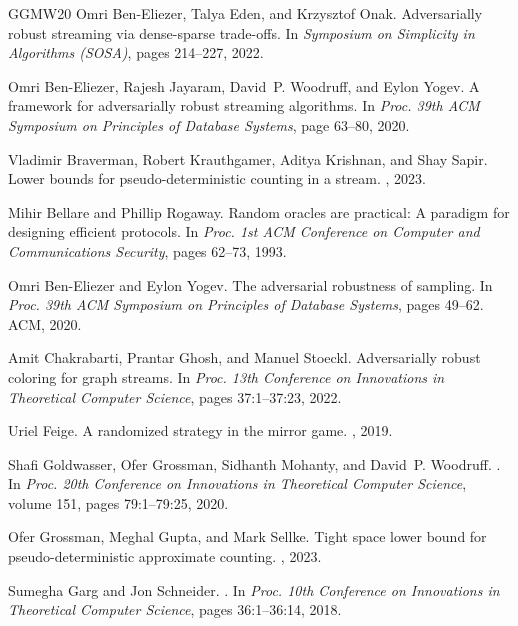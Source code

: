 \documentclass[10pt,a4paper]{article}
\theoremstyle{definition}
\theoremstyle{remark}
\begin{document}
\begin{itemize}
\begin{itemize}
\begin{thebibliography}{GGMW20}
Omri Ben-Eliezer, Talya Eden, and Krzysztof Onak.
\newblock Adversarially robust streaming via dense-sparse trade-offs.
\newblock In {\em Symposium on Simplicity in Algorithms (SOSA)}, pages
  214--227, 2022.

Omri Ben{-}Eliezer, Rajesh Jayaram, David~P. Woodruff, and Eylon Yogev.
\newblock A framework for adversarially robust streaming algorithms.
\newblock In {\em Proc. 39th ACM Symposium on Principles of Database Systems},
  page 63–80, 2020.

Vladimir Braverman, Robert Krauthgamer, Aditya Krishnan, and Shay Sapir.
\newblock Lower bounds for pseudo-deterministic counting in a stream.
, 2023.

Mihir Bellare and Phillip Rogaway.
\newblock Random oracles are practical: A paradigm for designing efficient
  protocols.
\newblock In {\em Proc. 1st ACM Conference on Computer and Communications
  Security}, pages 62--73, 1993.

Omri Ben{-}Eliezer and Eylon Yogev.
\newblock The adversarial robustness of sampling.
\newblock In {\em Proc. 39th ACM Symposium on Principles of Database Systems},
  pages 49--62. {ACM}, 2020.

Amit Chakrabarti, Prantar Ghosh, and Manuel Stoeckl.
\newblock Adversarially robust coloring for graph streams.
\newblock In {\em Proc. 13th Conference on Innovations in Theoretical Computer
  Science}, pages 37:1--37:23, 2022.

Uriel Feige.
\newblock A randomized strategy in the mirror game.
, 2019.

Shafi Goldwasser, Ofer Grossman, Sidhanth Mohanty, and David~P. Woodruff.
.
\newblock In {\em Proc. 20th Conference on Innovations in Theoretical Computer
  Science}, volume 151, pages 79:1--79:25, 2020.

Ofer Grossman, Meghal Gupta, and Mark Sellke.
\newblock Tight space lower bound for pseudo-deterministic approximate
  counting.
, 2023.

Sumegha Garg and Jon Schneider.
.
\newblock In {\em Proc. 10th Conference on Innovations in Theoretical Computer
  Science}, pages 36:1--36:14, 2018.


\end{thebibliography}
\end{itemize}
\end{itemize}
\end{document}
